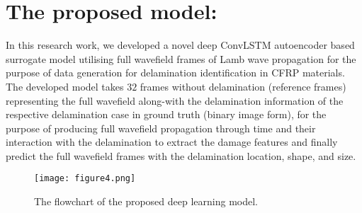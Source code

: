 \section{The proposed model:}
\label{proposed_approach}
In this research work, we developed a novel deep ConvLSTM autoencoder 
based surrogate model utilising full wavefield frames of Lamb wave propagation 
for the purpose of data generation for delamination identification in CFRP 
materials.
The developed model takes \(32\) frames without delamination 
(reference frames) representing the full wavefield along-with the delamination 
information of the respective delamination case in ground truth (binary image 
form), for the purpose of producing full wavefield propagation through time and 
their interaction with the delamination to extract the damage features and 
finally predict the full wavefield frames with the delamination location, 
shape, and size.
\begin{figure} [h!]
	\begin{center}
		\texttt{[image: figure4.png]}
	\end{center}
	\caption{The flowchart of the proposed deep learning model.} 
	\label{fig:proposed_model}
\end{figure}

